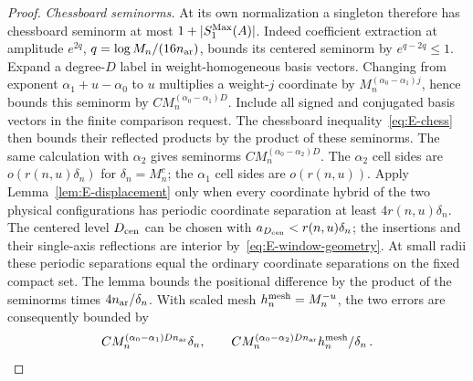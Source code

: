 \begin{proof}
\emph{Chessboard seminorms.} At its own normalization a singleton therefore has chessboard seminorm at most $1+|S^{\mathrm{Max}}_1(A)|$. Indeed coefficient extraction at amplitude $e^{2q}$, $q=\log M_n/(16n_{\rm ar})$, bounds its centered seminorm by $e^{q-2q}\le1$. Expand a degree-$D$ label in weight-homogeneous basis vectors. Changing from exponent $\alpha_1+u-\alpha_0$ to $u$ multiplies a weight-$j$ coordinate by $M_n^{(\alpha_0-\alpha_1)j}$, hence bounds this seminorm by $CM_n^{(\alpha_0-\alpha_1)D}$. Include all signed and conjugated basis vectors in the finite comparison request. The chessboard inequality~\eqref{eq:E-chess} then bounds their reflected products by the product of these seminorms. The same calculation with $\alpha_2$ gives seminorms $CM_n^{(\alpha_0-\alpha_2)D}$. The $\alpha_2$ cell sides are $o(r(n,u)\delta_n)$ for $\delta_n=M_n^c$; the $\alpha_1$ cell sides are $o(r(n,u))$. Apply Lemma~\ref{lem:E-displacement} only when every coordinate hybrid of the two physical configurations has periodic coordinate separation at least $4r(n,u)\delta_n$. The centered level $D_{\rm cen}$ can be chosen with $a_{D_{\rm cen}}<r(n,u)\delta_n$; the insertions and their single-axis reflections are interior by~\eqref{eq:E-window-geometry}. At small radii these periodic separations equal the ordinary coordinate separations on the fixed compact set. The lemma bounds the positional difference by the product of the seminorms times $4n_{\rm ar}/\delta_n$. With scaled mesh $h^{\rm mesh}_n=M_n^{-u}$, the two errors are consequently bounded by
\begin{equation*}
 C M_n^{(\alpha_0-\alpha_1)Dn_{\rm ar}}\delta_n,
 \qquad C M_n^{(\alpha_0-\alpha_2)Dn_{\rm ar}}h^{\rm mesh}_n/\delta_n\,.
\end{equation*}

\end{proof}
